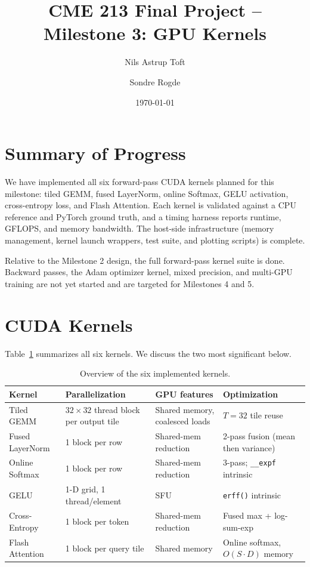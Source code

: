 \documentclass[11pt,letterpaper]{article}
\title{\vspace{-2em}CME 213 Final Project -- Milestone 3: GPU Kernels}
\author{Nils Astrup Toft \and Sondre Rogde}
\date{\today}
\begin{document}
\maketitle\vspace{-1em}

\section{Summary of Progress}

We have implemented all six forward-pass CUDA kernels planned for this milestone: tiled GEMM, fused LayerNorm, online Softmax, GELU activation, cross-entropy loss, and Flash Attention. Each kernel is validated against a CPU reference and PyTorch ground truth, and a timing harness reports runtime, GFLOPS, and memory bandwidth. The host-side infrastructure (memory management, kernel launch wrappers, test suite, and plotting scripts) is complete.

Relative to the Milestone 2 design, the full forward-pass kernel suite is done. Backward passes, the Adam optimizer kernel, mixed precision, and multi-GPU training are not yet started and are targeted for Milestones 4 and 5.

\section{CUDA Kernels}

Table~\ref{tab:kernels} summarizes all six kernels. We discuss the two most significant below.

\begin{table}[h]
  \centering
  \small
  \begin{tabular}{lllp{4.2cm}}
    \toprule
    \textbf{Kernel} & \textbf{Parallelization} & \textbf{GPU features} & \textbf{Optimization} \\
    \midrule
    Tiled GEMM       & $32{\times}32$ thread block per output tile & Shared memory, coalesced loads & $T{=}32$ tile reuse \\
    Fused LayerNorm  & 1 block per row            & Shared-mem reduction & 2-pass fusion (mean then variance) \\
    Online Softmax   & 1 block per row            & Shared-mem reduction & 3-pass; \texttt{\_\_expf} intrinsic \\
    GELU             & 1-D grid, 1 thread/element & SFU                  & \texttt{erff()} intrinsic \\
    Cross-Entropy    & 1 block per token          & Shared-mem reduction & Fused max + log-sum-exp \\
    Flash Attention  & 1 block per query tile     & Shared memory        & Online softmax, $O(S{\cdot}D)$ memory \\
    \bottomrule
  \end{tabular}
  \caption{Overview of the six implemented kernels.}
  \label{tab:kernels}
\end{table}
\end{document}
